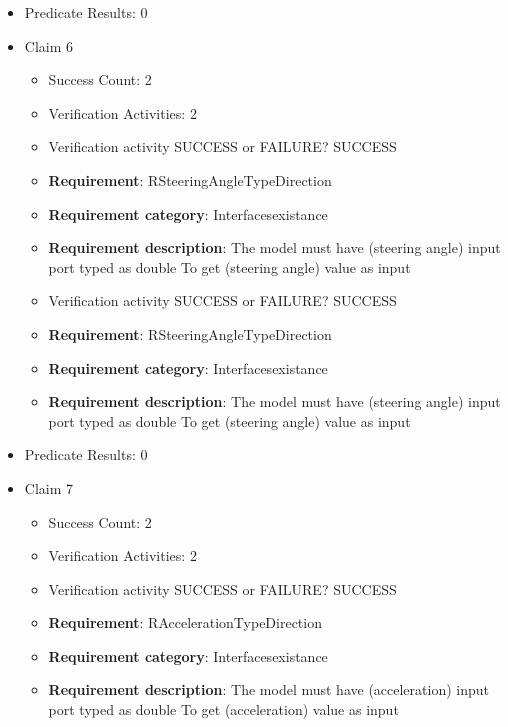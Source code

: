 \documentclass{article}
\begin{document}
\begin{itemize}
									    
				\item Predicate Results: 0

  				  \item Claim 6
				\begin{itemize}
			    	\item Success Count: 2 
			    	\item Verification Activities: 2
					\item Verification activity SUCCESS or FAILURE? SUCCESS
		
						\item \textbf{Requirement}: RSteeringAngleTypeDirection 
						\item \textbf{Requirement category}: Interfacesexistance 
						\item \textbf{Requirement description}: The model must have (steering angle) input port typed as double To get (steering angle) value as input
					
					\item Verification activity SUCCESS or FAILURE? SUCCESS
		
						\item \textbf{Requirement}: RSteeringAngleTypeDirection 
						\item \textbf{Requirement category}: Interfacesexistance 
						\item \textbf{Requirement description}: The model must have (steering angle) input port typed as double To get (steering angle) value as input
					
				\end{itemize}
				
									    
				\item Predicate Results: 0

  				  \item Claim 7
				\begin{itemize}
			    	\item Success Count: 2 
			    	\item Verification Activities: 2
					\item Verification activity SUCCESS or FAILURE? SUCCESS
		
						\item \textbf{Requirement}: RAccelerationTypeDirection 
						\item \textbf{Requirement category}: Interfacesexistance 
						\item \textbf{Requirement description}: The model must have (acceleration) input port typed as double To get (acceleration) value as input
					

\end{itemize}
\end{itemize}
\end{document}
